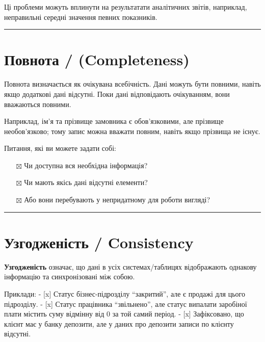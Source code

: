 \documentclass[
  letterpaper,
  DIV=11,
  numbers=noendperiod]{scrreprt}
\providecommand{\tightlist}{%
  \setlength{\itemsep}{0pt}\setlength{\parskip}{0pt}}\usepackage{longtable,booktabs,array}
\begin{document}
Ці проблеми можуть вплинути на результатати аналітичних звітів,
наприклад, неправильні середні значення певних показників.

\begin{center}\rule{0.5\linewidth}{0.5pt}\end{center}

\section{Повнота /
(Completeness)}\label{ux43fux43eux432ux43dux43eux442ux430-completeness}

Повнота визначається як очікувана всебічність. Дані можуть бути повними,
навіть якщо додаткові дані відсутні. Поки дані відповідають очікуванням,
вони вважаються повними.

Наприклад, ім'я та прізвище замовника є обов'язковими, але прізвище
необов'язково; тому запис можна вважати повним, навіть якщо прізвища не
існує.

Питання, які ви можете задати собі:

\begin{itemize}
\tightlist
\item[$\boxtimes$]
  Чи доступна вся необхідна інформація?
\item[$\boxtimes$]
  Чи мають якісь дані відсутні елементи?
\item[$\boxtimes$]
  Або вони перебувають у непридатному для роботи вигляді?
\end{itemize}

\begin{center}\rule{0.5\linewidth}{0.5pt}\end{center}

\section{Узгодженість /
Consistency}\label{ux443ux437ux433ux43eux434ux436ux435ux43dux456ux441ux442ux44c-consistency}

\textbf{Узгодженість} означає, що дані в усіх системах/таблицях
відображають однакову інформацію та синхронізовані між собою.

Приклади: - {[}x{]} Статус бізнес-підрозділу ``закритий'', але є продажі
для цього підрозділу. - {[}x{]} Статус працівника ``звільнено'', але
статус випалати заробіної плати містить суму відмінну від 0 за той самий
період. - {[}x{]} Зафіксовано, що клієнт має у банку депозити, але у
даних про депозити записи по клієнту відсутні.
\end{document}
